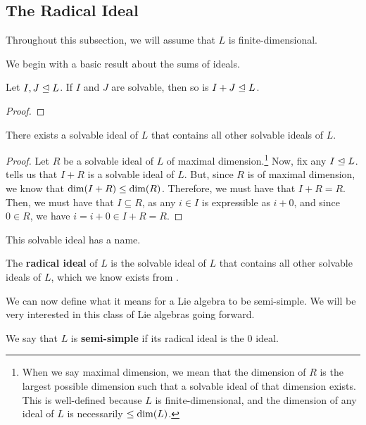 \subsection{The Radical Ideal}

Throughout this subsection, we will assume that $L$ is finite-dimensional.

We begin with a basic result about the sums of ideals.

\begin{boxlemma}\label{Ch1:Lemma:SumIdealSolvable}
    Let $I, J \trianglelefteq L$. If $I$ and $J$ are solvable, then so is $I + J \trianglelefteq L$.
\end{boxlemma}
\begin{proof}
    \sorry
\end{proof}

\begin{boxcorollary}\label{Ch1:Cor:RadExists}
    There exists a solvable ideal of $L$ that contains all other solvable ideals of $L$.
\end{boxcorollary}
\begin{proof}
    Let $R$ be a solvable ideal of $L$ of maximal dimension.\footnote{When we say maximal dimension, we mean that the dimension of $R$ is the largest possible dimension such that a solvable ideal of that dimension exists. This is well-defined because $L$ is finite-dimensional, and the dimension of any ideal of $L$ is necessarily $\leq \dim\!\left( L \right)$.} Now, fix any $I \trianglelefteq L$.  tells us that $I + R$ is a solvable ideal of $L$. But, since $R$ is of maximal dimension, we know that $\dim\!\left( I + R \right) \leq \dim\!\left( R \right)$. Therefore, we must have that $I + R = R$. Then, we must have that $I \subseteq R$, as any $i \in I$ is expressible as $i + 0$, and since $0 \in R$, we have $i = i + 0 \in I + R = R$.
\end{proof}

This solvable ideal has a name.

\begin{boxdefinition}
    The \textbf{radical ideal} of $L$ is the solvable ideal of $L$ that contains all other solvable ideals of $L$, which we know exists from .
\end{boxdefinition}

We can now define what it means for a Lie algebra to be semi-simple. We will be very interested in this class of Lie algebras going forward.

\begin{boxdefinition}\label{Ch1:Def:SemiSimple}
    We say that $L$ is \textbf{semi-simple} if its radical ideal is the $0$ ideal.
\end{boxdefinition}

